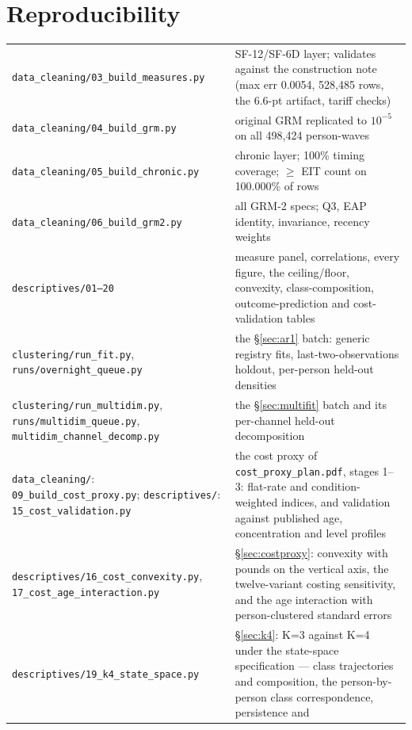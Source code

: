 \documentclass[11pt]{article}
\newcommand{\code}[1]{\texttt{\small #1}}
\begin{document}
\section{Reproducibility}

\begin{center}\small
\begin{tabular}{@{}>{\raggedright\arraybackslash}p{6.1cm}>{\raggedright\arraybackslash}p{8.0cm}@{}}
\toprule
\code{data\_cleaning/03\_build\_measures.py} & SF-12/SF-6D layer; validates
against the construction note (max err 0.0054, 528{,}485 rows, the 6.6-pt
artifact, tariff checks) \\
\code{data\_cleaning/04\_build\_grm.py} & original GRM replicated to
$10^{-5}$ on all 498{,}424 person-waves \\
\code{data\_cleaning/05\_build\_chronic.py} & chronic layer; 100\% timing
coverage; $\ge$ EIT count on 100.000\% of rows \\
\code{data\_cleaning/06\_build\_grm2.py} & all GRM-2 specs; Q3, EAP
identity, invariance, recency weights \\
\code{descriptives/01--20} & measure panel, correlations, every figure, the
ceiling/floor, convexity, class-composition, outcome-prediction and
cost-validation tables \\
\code{clustering/run\_fit.py}, \code{runs/overnight\_queue.py} & the
\S\ref{sec:ar1} batch: generic registry fits, last-two-observations holdout,
per-person held-out densities \\
\code{clustering/run\_multidim.py}, \code{runs/multidim\_queue.py},
\code{multidim\_channel\_decomp.py} & the \S\ref{sec:multifit} batch and its
per-channel held-out decomposition \\
\code{data\_cleaning/}: \code{09\_build\_cost\_proxy.py};
\code{descriptives/}: \code{15\_cost\_validation.py} & the cost proxy of
\code{cost\_proxy\_plan.pdf}, stages 1--3: flat-rate and condition-weighted
indices, and validation against published age, concentration and level
profiles \\
\code{descriptives/16\_cost\_convexity.py},
\code{17\_cost\_age\_interaction.py} & \S\ref{sec:costproxy}: convexity with
pounds on the vertical axis, the twelve-variant costing sensitivity, and the
age interaction with person-clustered standard errors \\
\code{descriptives/19\_k4\_state\_space.py} & \S\ref{sec:k4}: K=3 against
K=4 under the state-space specification --- class trajectories and
composition, the person-by-person class correspondence, persistence and

\end{tabular}
\end{center}
\end{document}
